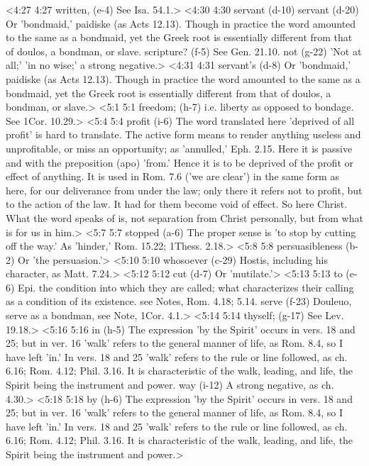 <4:27 4:27  written, (e-4)  See Isa. 54.1.>
<4:30 4:30  servant (d-10)  servant (d-20)  Or 'bondmaid,' paidiske (as Acts 12.13). Though in practice  the word amounted to the same as a bondmaid, yet the Greek root  is essentially different from that of doulos, a bondman, or  slave.
  scripture? (f-5)  See Gen. 21.10.
  not (g-22)  'Not at all;' 'in no wise;' a strong negative.>
<4:31 4:31  servant's (d-8)  Or 'bondmaid,' paidiske (as Acts 12.13). Though in practice  the word amounted to the same as a bondmaid, yet the Greek root  is essentially different from that of doulos, a bondman, or  slave.>
<5:1 5:1  freedom; (h-7)  i.e. liberty as opposed to bondage. See 1Cor. 10.29.>
<5:4 5:4  profit (i-6)  The word translated here 'deprived of all profit' is hard to  translate. The active form means to render anything useless and  unprofitable, or miss an opportunity; as 'annulled,' Eph. 2.15.  Here it is passive and with the preposition (apo) 'from.'  Hence it is to be deprived of the profit or effect of anything.  It is used in Rom. 7.6 ('we are clear') in the same form as  here, for our deliverance from under the law; only there it  refers not to profit, but to the action of the law. It had for them become void of effect. So here Christ. What the word  speaks of is, not separation from Christ personally, but from  what is for us in him.>
<5:7 5:7  stopped (a-6)  The proper sense is 'to stop by cutting off the way.' As  'hinder,' Rom. 15.22; 1Thess. 2.18.>
<5:8 5:8  persuasibleness (b-2)  Or 'the persuasion.'>
<5:10 5:10  whosoever (c-29)  Hostis, including his character, as Matt. 7.24.>
<5:12 5:12  cut (d-7)  Or 'mutilate.'>
<5:13 5:13  to (e-6)  Epi. the condition into which they are called; what  characterizes their calling as a condition of its existence.  see Notes, Rom. 4.18; 5.14.
  serve (f-23)  Douleuo, serve as a bondman, see Note, 1Cor. 4.1.>
<5:14 5:14  thyself; (g-17)  See Lev. 19.18.>
<5:16 5:16  in (h-5)  The expression 'by the Spirit' occurs in vers. 18 and 25; but  in ver. 16 'walk' refers to the general manner of life, as Rom.  8.4, so I have left 'in.' In vers. 18 and 25 'walk' refers to  the rule or line followed, as ch. 6.16; Rom. 4.12; Phil. 3.16.  It is characteristic of the walk, leading, and life, the Spirit  being the instrument and power.
  way (i-12)  A strong negative, as ch. 4.30.>
<5:18 5:18  by (h-6)  The expression 'by the Spirit' occurs in vers. 18 and 25; but  in ver. 16 'walk' refers to the general manner of life, as Rom.  8.4, so I have left 'in.' In vers. 18 and 25 'walk' refers to  the rule or line followed, as ch. 6.16; Rom. 4.12; Phil. 3.16.  It is characteristic of the walk, leading, and life, the Spirit  being the instrument and power.>
